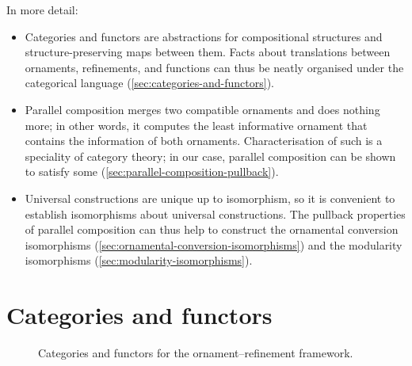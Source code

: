 In more detail:
\begin{itemize}
\item Categories and functors are abstractions for compositional structures and structure-preserving maps between them.
Facts about translations between ornaments, refinements, and functions can thus be neatly organised under the categorical language (\autoref{sec:categories-and-functors}).
\item Parallel composition merges two compatible ornaments and does nothing more; in other words, it computes the least informative ornament that contains the information of both ornaments.
Characterisation of such  is a speciality of category theory; in our case, parallel composition can be shown to satisfy some  (\autoref{sec:parallel-composition-pullback}).
\item Universal constructions are unique up to isomorphism, so it is convenient to establish isomorphisms about universal constructions.
The pullback properties of parallel composition can thus help to construct the ornamental conversion isomorphisms (\autoref{sec:ornamental-conversion-isomorphisms}) and the modularity isomorphisms (\autoref{sec:modularity-isomorphisms}).
\end{itemize}


\section{Categories and functors}
\label{sec:categories-and-functors}

\begin{figure}
\begin{center}
\end{center}
\caption{Categories and functors for the ornament--refinement framework.}
\label{fig:categories}
\end{figure}


